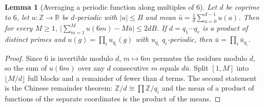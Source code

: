 \documentclass[11pt,a4paper]{article}
\theoremstyle{plain}
\newtheorem{lemma}[theorem]{Lemma}
\theoremstyle{definition}
\theoremstyle{remark}
\newcommand{\Z}{\mathbb{Z}}
\begin{document}
\begin{lemma}[Averaging a periodic function along multiples of $6$]\label{lem:periodic}
Let $d$ be coprime to $6$, let $u:\Z\to\mathbb R$ be $d$-periodic with
$|u|\le B$ and mean $\bar u=\frac1d\sum_{a=0}^{d-1}u(a)$.  Then for every
$M\ge1$, $\bigl|\sum_{m=1}^{M}u(6m)-M\bar u\bigr|\le 2dB$.  If
$d=q_1\cdots q_r$ is a product of distinct primes and
$u(g)=\prod_i u_{q_i}(g)$ with $u_{q_i}$ $q_i$-periodic, then
$\bar u=\prod_i\bar u_{q_i}$.
\end{lemma}
\begin{proof}
Since $6$ is invertible modulo $d$, $m\mapsto6m$ permutes the residues
modulo $d$, so the sum of $u(6m)$ over any $d$ consecutive $m$ equals
$d\bar u$.  Split $[1,M]$ into $\lfloor M/d\rfloor$ full blocks and a
remainder of fewer than $d$ terms.  The second statement is the Chinese
remainder theorem: $\Z/d\cong\prod\Z/q_i$ and the mean of a product of
functions of the separate coordinates is the product of the means.
\end{proof}
\end{document}
